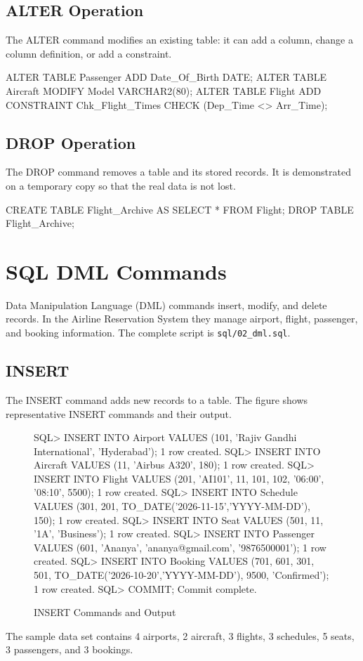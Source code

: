 \documentclass[12pt,a4paper]{article}
\begin{document}
\subsection{ALTER Operation}
The ALTER command modifies an existing table: it can add a column, change a column definition, or add a
constraint.
\begin{code}
ALTER TABLE Passenger ADD Date_Of_Birth DATE;
ALTER TABLE Aircraft  MODIFY Model VARCHAR2(80);
ALTER TABLE Flight    ADD CONSTRAINT Chk_Flight_Times
      CHECK (Dep_Time <> Arr_Time);
\end{code}

\subsection{DROP Operation}
The DROP command removes a table and its stored records. It is demonstrated on a temporary copy so that the
real data is not lost.
\begin{code}
CREATE TABLE Flight_Archive AS SELECT * FROM Flight;
DROP TABLE Flight_Archive;
\end{code}

\section{SQL DML Commands}
Data Manipulation Language (DML) commands insert, modify, and delete records. In the Airline Reservation
System they manage airport, flight, passenger, and booking information. The complete script is
\texttt{sql/02\_dml.sql}.

\subsection{INSERT}
The INSERT command adds new records to a table. The figure shows representative INSERT commands and their
output.
\begin{figure}[H]
\begin{terminal}
SQL> INSERT INTO Airport VALUES (101, 'Rajiv Gandhi International', 'Hyderabad');
1 row created.
SQL> INSERT INTO Aircraft VALUES (11, 'Airbus A320', 180);
1 row created.
SQL> INSERT INTO Flight VALUES (201, 'AI101', 11, 101, 102, '06:00', '08:10', 5500);
1 row created.
SQL> INSERT INTO Schedule VALUES (301, 201, TO_DATE('2026-11-15','YYYY-MM-DD'), 150);
1 row created.
SQL> INSERT INTO Seat VALUES (501, 11, '1A', 'Business');
1 row created.
SQL> INSERT INTO Passenger VALUES (601, 'Ananya', 'ananya@gmail.com', '9876500001');
1 row created.
SQL> INSERT INTO Booking VALUES (701, 601, 301, 501, TO_DATE('2026-10-20','YYYY-MM-DD'), 9500, 'Confirmed');
1 row created.
SQL> COMMIT;
Commit complete.
\end{terminal}
\caption{INSERT Commands and Output}
\end{figure}
The sample data set contains 4 airports, 2 aircraft, 3 flights, 3 schedules, 5 seats, 3 passengers, and
3 bookings.
\end{document}
